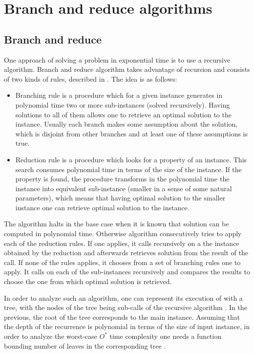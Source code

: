\section{Branch and reduce algorithms}
\subsection{Branch and reduce} \label{branch_and_reduce}
One approach of solving a problem in exponential time is to use a recursive algorithm. Branch and reduce algorithm takes advantage of recursion and consists of two kinds of rules, described in \cite{DBLP:journals/eatcs/FominGK05}. The idea is as follows:
\begin{itemize}
    \item Branching rule is a procedure which for a given instance generates in polynomial time two or more sub-instances (solved recursively). Having solutions to all of them allows one to retrieve an optimal solution to the instance. Usually each branch makes some assumption about the solution, which is disjoint from other branches and at least one of these assumptions is true. 
    \item Reduction rule is a procedure which looks for a property of an instance. This search consumes polynomial time in terms of the size of the instance. If the property is found, the procedure transforms in the polynomial time the instance into equivalent sub-instance (smaller in a sense of some natural parameters), which means that having optimal solution to the smaller instance one can retrieve optimal solution to the instance.
\end{itemize}

The algorithm halts in the base case when it is known that solution can be computed in polynomial time. Otherwise algorithm consecutively tries to apply each of the reduction rules. If one applies, it calls recursively on a the instance obtained by the reduction and afterwards retrieves solution from the result of the call. If none of the rules applies, it chooses from a set of branching rules one to apply. It calls on each of the sub-instances recursively and compares the results to choose the one from which optimal solution is retrieved.
\par In order to analyze such an algorithm, one can represent its execution of with a tree, with the nodes of the tree being sub-calls of the recursive algorithm \cite{DBLP:journals/eatcs/FominGK05}. In the previous, the root of the tree corresponds to the main instance. Assuming that the depth of the recurrence is polynomial in terms of the size of input instance, in order to analyze the worst-case $O^*$ time complexity one needs a function bounding number of leaves in the corresponding tree \cite{VANROOIJ20112147}.\par
